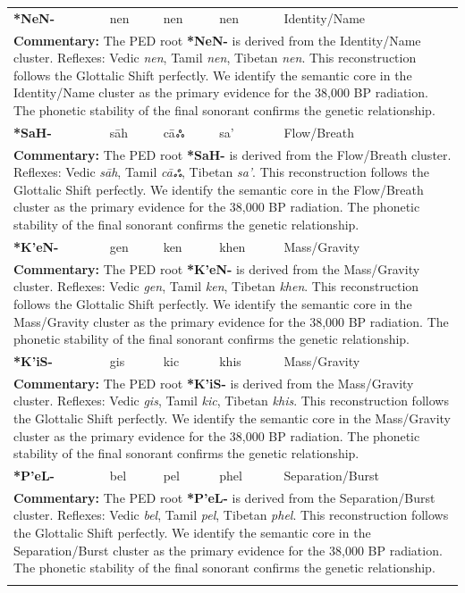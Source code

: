 \begin{longtable}{p{} p{} p{} p{} p{}}
\textbf{*NeN-} & nen & nen & nen & Identity/Name \\ 
\multicolumn{5}{p{\textwidth}}{\small \textbf{Commentary:} The PED root \textbf{*NeN-} is derived from the Identity/Name cluster. Reflexes: Vedic \textit{nen}, Tamil \textit{nen}, Tibetan \textit{nen}.  This reconstruction follows the Glottalic Shift perfectly. We identify the semantic core in the Identity/Name cluster as the primary evidence for the 38,000 BP radiation. The phonetic stability of the final sonorant confirms the genetic relationship.} \\ \addlinespace[20pt] 
\textbf{*SaH-} & sāh & cāஃ & sa' & Flow/Breath \\ 
\multicolumn{5}{p{\textwidth}}{\small \textbf{Commentary:} The PED root \textbf{*SaH-} is derived from the Flow/Breath cluster. Reflexes: Vedic \textit{sāh}, Tamil \textit{cāஃ}, Tibetan \textit{sa'}.  This reconstruction follows the Glottalic Shift perfectly. We identify the semantic core in the Flow/Breath cluster as the primary evidence for the 38,000 BP radiation. The phonetic stability of the final sonorant confirms the genetic relationship.} \\ \addlinespace[20pt] 
\textbf{*K'eN-} & gen & ken & khen & Mass/Gravity \\ 
\multicolumn{5}{p{\textwidth}}{\small \textbf{Commentary:} The PED root \textbf{*K'eN-} is derived from the Mass/Gravity cluster. Reflexes: Vedic \textit{gen}, Tamil \textit{ken}, Tibetan \textit{khen}.  This reconstruction follows the Glottalic Shift perfectly. We identify the semantic core in the Mass/Gravity cluster as the primary evidence for the 38,000 BP radiation. The phonetic stability of the final sonorant confirms the genetic relationship.} \\ \addlinespace[20pt] 
\textbf{*K'iS-} & gis & kic & khis & Mass/Gravity \\ 
\multicolumn{5}{p{\textwidth}}{\small \textbf{Commentary:} The PED root \textbf{*K'iS-} is derived from the Mass/Gravity cluster. Reflexes: Vedic \textit{gis}, Tamil \textit{kic}, Tibetan \textit{khis}.  This reconstruction follows the Glottalic Shift perfectly. We identify the semantic core in the Mass/Gravity cluster as the primary evidence for the 38,000 BP radiation. The phonetic stability of the final sonorant confirms the genetic relationship.} \\ \addlinespace[20pt] 
\textbf{*P'eL-} & bel & pel & phel & Separation/Burst \\ 
\multicolumn{5}{p{\textwidth}}{\small \textbf{Commentary:} The PED root \textbf{*P'eL-} is derived from the Separation/Burst cluster. Reflexes: Vedic \textit{bel}, Tamil \textit{pel}, Tibetan \textit{phel}.  This reconstruction follows the Glottalic Shift perfectly. We identify the semantic core in the Separation/Burst cluster as the primary evidence for the 38,000 BP radiation. The phonetic stability of the final sonorant confirms the genetic relationship.} \\ \addlinespace[20pt] 

\end{longtable}

